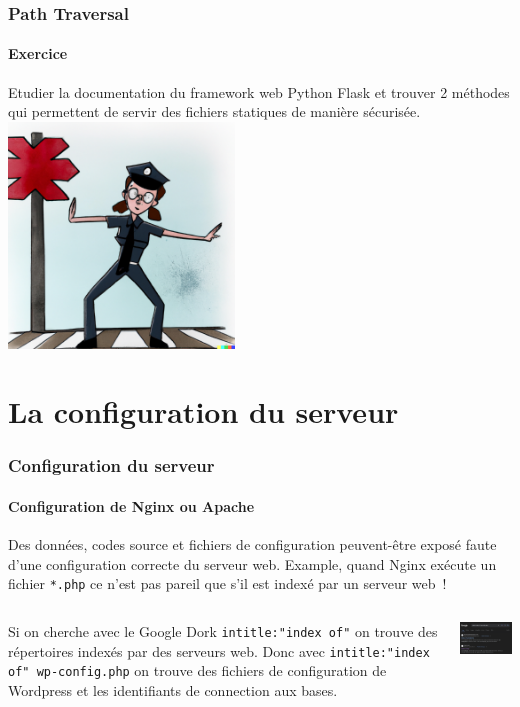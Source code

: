 \documentclass{beamer}
\begin{document}
    \begin{frame}
        \frametitle{Path Traversal}
        \framesubtitle{Exercice \execcounterdispinc{}}
        \transdissolve
        Etudier la documentation du framework web Python Flask et trouver 2 méthodes qui permettent de servir des fichiers statiques de manière sécurisée.
        \bigbreak
        \centering
        \includegraphics[width=6cm]{image/police-blocking-the-road}
    \end{frame}


    \section{La configuration du serveur}\label{sec:configuration-serveur}

    \begin{frame}
        \frametitle{Configuration du serveur}
        \framesubtitle{Configuration de Nginx ou Apache}
        \transdissolve
        Des données, codes source et fichiers de configuration peuvent-être exposé faute d'une configuration correcte du serveur web.
        \bigbreak
        Example, quand Nginx exécute un fichier \lstinline{*.php} ce n'est pas pareil que s'il est indexé par un serveur web~!
        \bigbreak
        \begin{columns}
            \begin{column}{0.6\textwidth}
                Si on cherche avec le Google Dork \lstinline{intitle:"index of"} on trouve des répertoires indexés par des serveurs web.
                Donc avec \lstinline{intitle:"index of" wp-config.php} on trouve des fichiers de configuration de Wordpress et les identifiants de connection aux bases.

            \end{column}
            \begin{column}{0.4\textwidth}
                \centering
                \includegraphics[width=5cm]{image/dork-on-google}
            \end{column}
        \end{columns}
    \end{frame}
\end{document}
